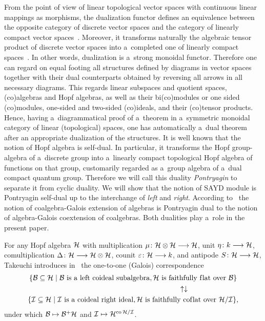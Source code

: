\documentclass[pdftex]{sigma}
\numberwithin{equation}{section}
\DeclareMathOperator{\co}{co}
\begin{document}
From the point of view of linear topological vector spaces with continuous linear mappings as morphisms, the dualization
functor def\/ines an equivalence between the opposite category of discrete vector spaces and the category of linearly
compact vector spaces~\cite[Proposition~24.8]{BergmanHausknecht-book}.
Moreover, it transforms naturally the algebraic tensor product of discrete vector spaces into a~completed one of
linearly compact spaces~\cite[Corollary~24.25]{BergmanHausknecht-book}.
In other words, dualization is a~strong monoidal functor.
Therefore one can regard on equal footing all structures def\/ined by diagrams in vector spaces together with their dual
counterparts obtained by reversing all arrows in all necessary diagrams.
This regards linear subspaces and quotient spaces, (co)algebras and Hopf algebras, as well as their bi(co)modules or one
sided (co)modules, one-sided and two-sided (co)ideals, and their (co)tensor products.
Hence, having a~diagrammatical proof of a~theorem in a~symmetric monoidal category of linear (topological) spaces, one
has automatically a~dual theorem after an appropriate dualization of the structures.
It is well known that the notion of Hopf algebra is self-dual.
In particular, it transforms the Hopf group-algebra of a~discrete group into a~linearly compact topological Hopf algebra
of functions on that group, customarily regarded as a~group algebra of a~dual compact quantum group.
Therefore we will call this duality \emph{Pontryagin} to separate it from cyclic duality.
We will show that the notion of SAYD module is Pontryagin self-dual up to the interchange of \emph{left} and
\emph{right}.
According to~\cite{Brze97,BrzeHaja99} the notion of coalgebra-Galois extension of algebras is Pontryagin dual to the
notion of algebra-Galois coextension of coalgebras.
Both dualities play a~role in the present paper.

For any Hopf algebra ${\cal H}$ with multiplication $\mu\colon {\cal H} \otimes{\cal H}\longrightarrow {\cal H}$, unit $\eta\colon
k\longrightarrow {\cal H}$, comultiplication $\Delta\colon {\cal H}\longrightarrow{\cal H}\otimes{\cal H}$, counit
$\varepsilon\colon {\cal H}\longrightarrow k$, and antipode $S\colon {\cal H}\longrightarrow{\cal H}$, Takeuchi introduces
in~\cite{Take72} the one-to-one (Galois) correspondence
\begin{gather*}
\{{\cal B}\subseteq {\cal H} \mid {\cal B}\ {\rm is\ a\ left\ coideal\ subalgebra}, {\cal H}\ {\rm is\ faithfully\ f\/lat\
over}\ {\cal B} \}
\\
\hspace*{50mm}\uparrow\downarrow
\\
\{{\cal I}\subseteq {\cal H} \mid {\cal I}\ {\rm is\ a\ coideal\ right\ ideal}, {\cal H}\ {\rm is\ faithfully\ cof\/lat\
over}\ {\cal H}/{\cal I} \},
\end{gather*}
under which ${\cal B}\mapsto {\cal B}^{+}{\cal H}$ and ${\cal I}\mapsto {\cal H}^{\co {\cal H}/{\cal I}}$.
\end{document}
